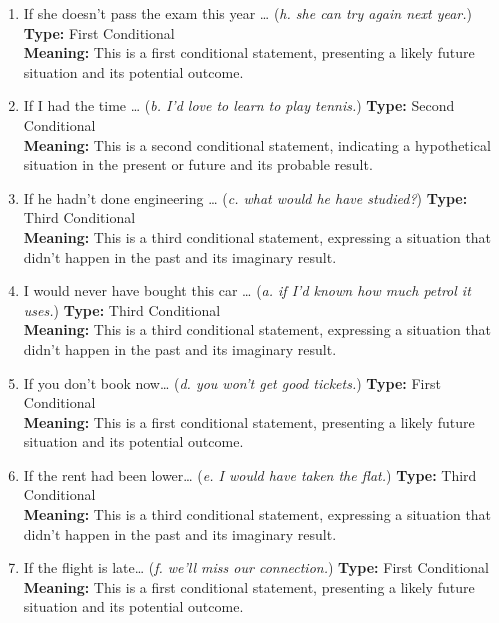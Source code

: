 \begin{enumerate}
      \item If she doesn’t pass the exam this year … (\textit{h. she can try again next year.})
            \textbf{Type:} First Conditional \\
            \textbf{Meaning:} This is a first conditional statement, presenting a likely future situation and its potential outcome.

      \item If I had the time … (\textit{b. I’d love to learn to play tennis.})
            \textbf{Type:} Second Conditional \\
            \textbf{Meaning:} This is a second conditional statement, indicating a hypothetical situation in the present or future and its probable result.

      \item If he hadn’t done engineering … (\textit{c. what would he have studied?})
            \textbf{Type:} Third Conditional \\
            \textbf{Meaning:} This is a third conditional statement, expressing a situation that didn't happen in the past and its imaginary result.

      \item I would never have bought this car … (\textit{a. if I’d known how much petrol it uses.})
            \textbf{Type:} Third Conditional \\
            \textbf{Meaning:} This is a third conditional statement, expressing a situation that didn't happen in the past and its imaginary result.

      \item If you don’t book now… (\textit{d. you won’t get good tickets.})
            \textbf{Type:} First Conditional \\
            \textbf{Meaning:} This is a first conditional statement, presenting a likely future situation and its potential outcome.

      \item If the rent had been lower… (\textit{e. I would have taken the flat.})
            \textbf{Type:} Third Conditional \\
            \textbf{Meaning:} This is a third conditional statement, expressing a situation that didn't happen in the past and its imaginary result.

      \item If the flight is late… (\textit{f. we’ll miss our connection.})
            \textbf{Type:} First Conditional \\
            \textbf{Meaning:} This is a first conditional statement, presenting a likely future situation and its potential outcome.


\end{enumerate}
